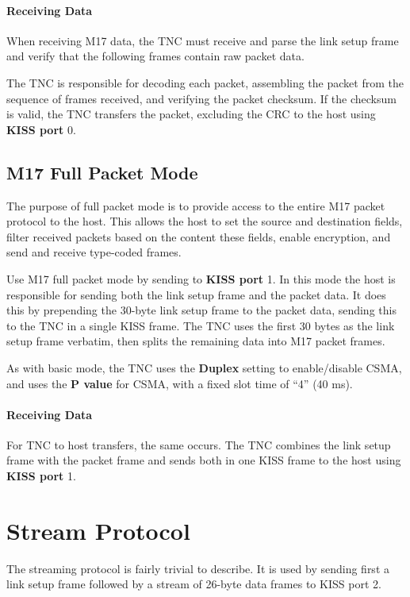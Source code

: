 \documentclass[a4paper,11pt]{book}
\begin{document}
\paragraph{Receiving Data}

When receiving M17 data, the TNC must receive and parse the link setup frame and verify that the following frames contain raw packet data.

The TNC is responsible for decoding each packet, assembling the packet from the sequence of frames received, and verifying the packet checksum. If the checksum is valid, the TNC transfers the packet, excluding the CRC to the host using \textbf{KISS port} 0.

\subsection{M17 Full Packet Mode}

The purpose of full packet mode is to provide access to the entire M17 packet protocol to the host. This allows the host to set the source and destination fields, filter received packets based on the content these fields, enable encryption, and send and receive type-coded frames.

Use M17 full packet mode by sending to \textbf{KISS port} 1. In this mode the host is responsible for sending both the link setup frame and the packet data. It does this by prepending the 30-byte link setup frame to the packet data, sending this to the TNC in a single KISS frame. The TNC uses the first 30 bytes as the link setup frame verbatim, then splits the remaining data into M17 packet frames.

As with basic mode, the TNC uses the \textbf{Duplex} setting to enable/disable CSMA, and uses the \textbf{P value} for CSMA, with a fixed slot time of ``4'' (40 ms).

\paragraph{Receiving Data}

For TNC to host transfers, the same occurs. The TNC combines the link setup frame with the packet frame and sends both in one KISS frame to the host using \textbf{KISS port} 1.

\section{Stream Protocol}

The streaming protocol is fairly trivial to describe. It is used by sending first a link setup frame followed by a stream of 26-byte data frames to KISS port 2.
\end{document}
